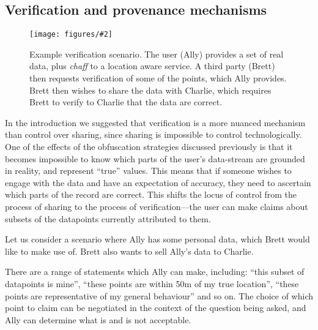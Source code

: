 \documentclass{IOS-Book-Article}     %
\newcommand{\fig}[3][0.9]{
\begin{figure}[tp]
\begin{center}
\texttt{[image: figures/\#2]}
\caption{#3}
\label{fig:#2}
\end{center}
\end{figure}
}
\begin{document}
\subsection{Verification and provenance mechanisms}

\fig{Verification}{Example verification scenario. The user (Ally) provides a set
of real data, plus \emph{chaff} to a location aware service. A third party
(Brett) then requests verification of some of the points, which Ally
provides. Brett then wishes to share the data with Charlie, which requires Brett
to verify to Charlie that the data are correct.}

In the introduction we suggested that verification is a more nuanced mechanism
than control over sharing, since sharing is impossible to control
technologically. One of the effects of the obfuscation strategies discussed
previously is that it becomes impossible to know which parts of the user's
data-stream are grounded in reality, and represent ``true'' values. This means
that if someone wishes to engage with the data and have an expectation of
accuracy, they need to ascertain which parts of the record are correct. This
shifts the locus of control from the process of sharing to the process of
verification---the user can make claims about subsets of the datapoints
currently attributed to them.

Let us consider a scenario where Ally has some personal data, which Brett would
like to make use of. Brett also wants to sell Ally's data to Charlie.

There are a range of statements which Ally can make, 
including:
``this subset of datapoints is mine'',
``these points are within 50m of my true location'',
``these points are representative of my general behaviour'' and so on. 
The choice of which point to claim can be negotiated
in the context of the question being asked, and Ally can determine what is
and is not acceptable.
\end{document}
